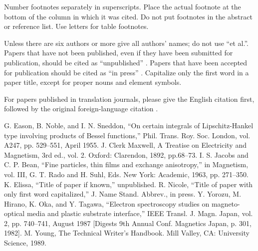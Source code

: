 \documentclass[conference]{IEEEtran}
\begin{document}
Number footnotes separately in superscripts. Place the actual footnote at 
the bottom of the column in which it was cited. Do not put footnotes in the 
abstract or reference list. Use letters for table footnotes.

Unless there are six authors or more give all authors' names; do not use 
``et al.''. Papers that have not been published, even if they have been 
submitted for publication, should be cited as ``unpublished'' \cite{b4}. Papers 
that have been accepted for publication should be cited as ``in press'' \cite{b5}. 
Capitalize only the first word in a paper title, except for proper nouns and 
element symbols.

For papers published in translation journals, please give the English 
citation first, followed by the original foreign-language citation \cite{b6}.

\begin{thebibliography}{00}


 G. Eason, B. Noble, and I. N. Sneddon, ``On certain integrals of Lipschitz-Hankel type involving products of Bessel functions,'' Phil. Trans. Roy. Soc. London, vol. A247, pp. 529--551, April 1955.
 J. Clerk Maxwell, A Treatise on Electricity and Magnetism, 3rd ed., vol. 2. Oxford: Clarendon, 1892, pp.68--73.
 I. S. Jacobs and C. P. Bean, ``Fine particles, thin films and exchange anisotropy,'' in Magnetism, vol. III, G. T. Rado and H. Suhl, Eds. New York: Academic, 1963, pp. 271--350.
 K. Elissa, ``Title of paper if known,'' unpublished.
 R. Nicole, ``Title of paper with only first word capitalized,'' J. Name Stand. Abbrev., in press.
 Y. Yorozu, M. Hirano, K. Oka, and Y. Tagawa, ``Electron spectroscopy studies on magneto-optical media and plastic substrate interface,'' IEEE Transl. J. Magn. Japan, vol. 2, pp. 740--741, August 1987 [Digests 9th Annual Conf. Magnetics Japan, p. 301, 1982].
 M. Young, The Technical Writer's Handbook. Mill Valley, CA: University Science, 1989.
\end{thebibliography}
\end{document}
